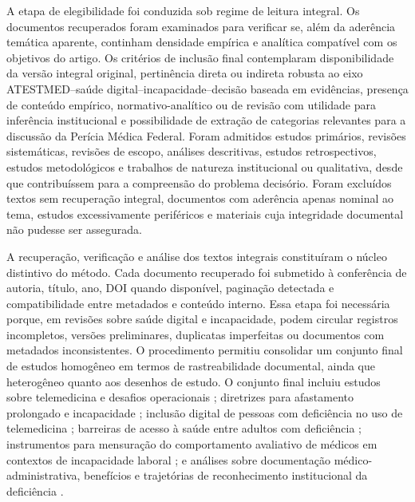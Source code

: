 \documentclass[12pt,a4paper]{article}
\begin{document}
A etapa de elegibilidade foi conduzida sob regime de leitura integral. Os documentos recuperados foram examinados para verificar se, além da aderência temática aparente, continham densidade empírica e analítica compatível com os objetivos do artigo. Os critérios de inclusão final contemplaram disponibilidade da versão integral original, pertinência direta ou indireta robusta ao eixo ATESTMED--saúde digital--incapacidade--decisão baseada em evidências, presença de conteúdo empírico, normativo-analítico ou de revisão com utilidade para inferência institucional e possibilidade de extração de categorias relevantes para a discussão da Perícia Médica Federal. Foram admitidos estudos primários, revisões sistemáticas, revisões de escopo, análises descritivas, estudos retrospectivos, estudos metodológicos e trabalhos de natureza institucional ou qualitativa, desde que contribuíssem para a compreensão do problema decisório. Foram excluídos textos sem recuperação integral, documentos com aderência apenas nominal ao tema, estudos excessivamente periféricos e materiais cuja integridade documental não pudesse ser assegurada.

A recuperação, verificação e análise dos textos integrais constituíram o núcleo distintivo do método. Cada documento recuperado foi submetido à conferência de autoria, título, ano, DOI quando disponível, paginação detectada e compatibilidade entre metadados e conteúdo interno. Essa etapa foi necessária porque, em revisões sobre saúde digital e incapacidade, podem circular registros incompletos, versões preliminares, duplicatas imperfeitas ou documentos com metadados inconsistentes. O procedimento permitiu consolidar um conjunto final de estudos homogêneo em termos de rastreabilidade documental, ainda que heterogêneo quanto aos desenhos de estudo. O conjunto final incluiu estudos sobre telemedicina e desafios operacionais \parencite{ftouni2022challengesoftelemedicineduringthecovid19pandemica}; diretrizes para afastamento prolongado e incapacidade \parencite{gabbay2011niceguidanceonlongtermsicknessandincapacity}; inclusão digital de pessoas com deficiência no uso de telemedicina \parencite{albasheer2026telemedicineutilizationanddigitalinclusionamongpe}; barreiras de acesso à saúde entre adultos com deficiência \parencite{m2024astudyofdisabilityseveritybarriersandfacilitatingfactor}; instrumentos para mensuração do comportamento avaliativo de médicos em contextos de incapacidade laboral \parencite{steenbeek2011thedevelopmentofinstrumentstomeasuretheworkdisa}; e análises sobre documentação médico-administrativa, benefícios e trajetórias de reconhecimento institucional da deficiência \parencite{rajasulochana2026doeshavingadisabilitycertificateensurebenefit, sa2020medicalcertificateofdisabilityadescriptiveanalysisofav, nogueira20200731t0100000100aavaliacaodadeficiencianatraje}.
\end{document}
